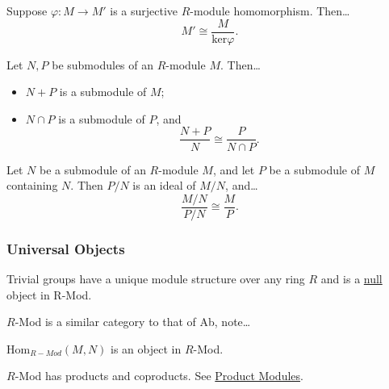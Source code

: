 \begin{corollary}
Suppose $\varphi : M \rightarrow M'$ is a surjective $R$-module homomorphism. Then\dots
$$M' \cong \frac{M}{\textrm{ker}\varphi}.$$
\end{corollary}

\begin{theorem}
Let $N,P$ be submodules of an $R$-module $M$. Then\dots
\begin{itemize}
  \item $N + P$ is a submodule of $M$;
  \item $N \cap P$ is a submodule of $P$, and
  			$$\frac{N + P}{N} \cong \frac{P}{N \cap P}.$$
\end{itemize}
\end{theorem}

\begin{theorem}
Let $N$ be a submodule of an $R$-module $M$, and let $P$ be a submodule of $M$ containing $N$. Then $P/N$ is an ideal of $M/N$,
and\dots
$$\frac{M/N}{P/N} \cong \frac{M}{P}.$$
\end{theorem}

\subsubsection{Universal Objects}

\begin{proposition}
Trivial groups have a unique module structure over any ring $R$ and is a \hyperref[null]{null} object in R-Mod.
\end{proposition}

\noindent $R$-Mod is a similar category to that of Ab, note\dots

\begin{proposition}
Hom$_{R-Mod}(M,N)$ is an object in $R$-Mod.
\end{proposition}

\begin{proposition}
$R$-Mod has products and coproducts. See \hyperref[productmodules]{Product Modules}.
\end{proposition}
